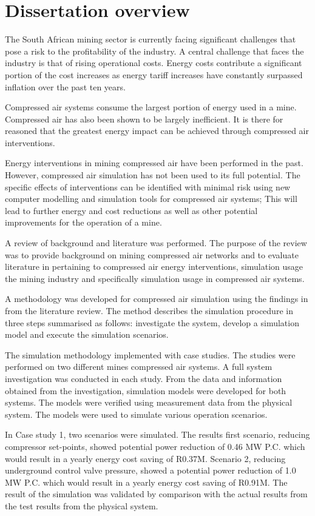 	 \section{Dissertation overview}
		The South African mining sector is currently facing significant challenges that pose a risk to the profitability of the industry. A central challenge that faces the industry is that of rising operational costs. Energy costs contribute a significant portion of the cost increases as energy tariff increases have constantly surpassed inflation over the past ten years.
	 \par
		Compressed air systems consume the largest portion of energy used in a mine. Compressed air has also been shown to be largely inefficient. It is there for reasoned that the greatest energy impact can be achieved through compressed air interventions.
	 \par 
		Energy interventions in mining compressed air have been performed in the past. However, compressed air simulation has not been used to its full potential.  The specific effects of interventions can be identified with minimal risk using new computer modelling and simulation tools for compressed air systems; This will lead to further energy and cost reductions as well as other potential improvements for the operation of a mine.
	 \par 
	 A review of background and literature was performed. The purpose of the review was to provide background on mining compressed air networks and to evaluate literature in pertaining to compressed air energy interventions, simulation usage the mining industry and specifically simulation usage in compressed air systems.
	 \par 
		A methodology was developed for compressed air simulation using the findings in from the literature review. The method describes the simulation procedure in three steps summarised as follows: investigate the system, develop a simulation model and execute the simulation scenarios.
	 \par 
The simulation methodology implemented with case studies. The studies were performed on two different mines compressed air systems. A full system investigation was conducted in each study. From the data and information obtained from the investigation, simulation models were developed for both systems. The models were verified using measurement data from the physical system. The models were used to simulate various operation scenarios.
	 \par 
In Case study 1, two scenarios were simulated. The results first scenario, reducing compressor  set-points, showed potential power reduction of 0.46 MW P.C. which would result in a yearly energy cost saving of R0.37M. Scenario 2, reducing underground control valve pressure, showed a potential power reduction of 1.0 MW P.C. which would result in a yearly energy cost saving of R0.91M. The result of the simulation was validated by comparison with the actual results from the test results from the physical system.
